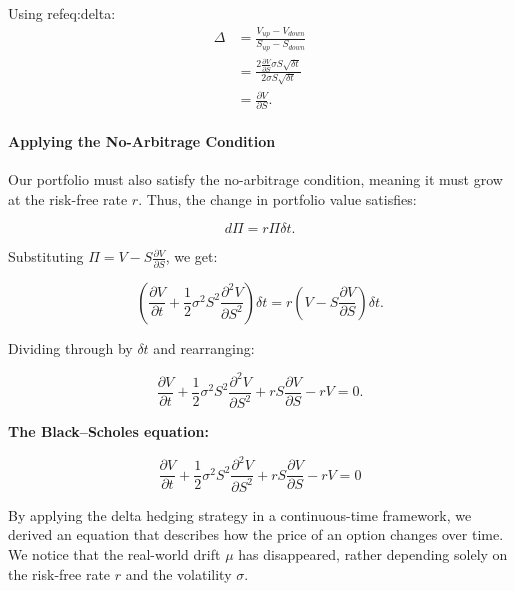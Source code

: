 \documentclass{article}
\begin{document}
Using ref{eq:delta}:
\begin{align*}
    \Delta &= \frac{V_{up} - V_{down}}{S_{up} - S_{down}} \\
    &= \frac{2 \frac{\partial V}{\partial S} \sigma S \sqrt{\delta t}}{2 \sigma S \sqrt{\delta t}} \\
    &= \frac{\partial V}{\partial S}.
\end{align*}


\paragraph{Applying the No-Arbitrage Condition}

Our portfolio must also satisfy the no-arbitrage condition, meaning it must grow at the risk-free rate $r$. Thus, the change in portfolio value satisfies:

\[
    d\Pi = r \Pi \delta t.
\]

Substituting \( \Pi = V - S \frac{\partial V}{\partial S} \), we get:

\[
    \left( \frac{\partial V}{\partial t} + \frac{1}{2} \sigma^2 S^2 \frac{\partial^2 V}{\partial S^2} \right) \delta t = r \left( V - S \frac{\partial V}{\partial S} \right) \delta t.
\]

Dividing through by \( \delta t \) and rearranging:

\[
    \frac{\partial V}{\partial t} + \frac{1}{2} \sigma^2 S^2 \frac{\partial^2 V}{\partial S^2} + r S \frac{\partial V}{\partial S} - r V = 0.
\]

\bigskip

\noindent
\textbf{The Black–Scholes equation:}

\begin{equation}
    \label{eq:black_scholes}
    \boxed{\frac{\partial V}{\partial t} + \frac{1}{2} \sigma^2 S^2 \frac{\partial^2 V}{\partial S^2} + r S \frac{\partial V}{\partial S} - r V = 0}
\end{equation}

By applying the delta hedging strategy in a continuous-time framework, we derived an equation that describes how the price of an option changes over time.
We notice that the real-world drift \( \mu \) has disappeared, rather depending solely on the risk-free rate \( r \) and the volatility \( \sigma \).




\printbibliography
\end{document}

